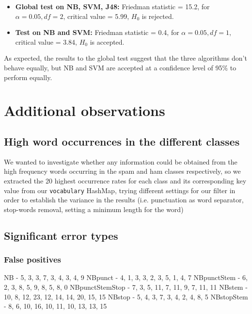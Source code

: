\documentclass[12pt,a4paper]{report}
\begin{document}
\begin{itemize}
\item \textbf{Global test on NB, SVM, J48:} Friedman statistic = 15.2, for $ \alpha = 0.05, df = 2 $, critical value = 5.99, $ H_0 $ is rejected.
\item \textbf{Test on NB and SVM:} Friedman statistic = 0.4, for $ \alpha = 0.05, df = 1 $, critical value = 3.84, $ H_0 $ is accepted.
\end{itemize}

As expected, the results to the global test suggest that the three algorithms don't behave equally, but NB and SVM are accepted at a confidence level of 95\% to perform equally.

\section{Additional observations}
\subsection{High word occurrences in the different classes}
We wanted to investigate whether any information could be obtained from the high frequency words occurring in the spam and ham classes respectively, so we extracted the 20 highest occurrence rates for each class and its corresponding key value from our \texttt{vocabulary} HashMap, trying different settings for our filter in order to establish the variance in the results (i.e. punctuation as word separator, stop-words removal, setting a minimum length for the word)

\subsection{Significant error types}
\subsubsection{False positives}
NB - 5, 3, 3, 7, 3, 4, 3, 4, 9
NBpunct - 4, 1, 3, 3, 2, 3, 5, 1, 4, 7
NBpunctStem - 6, 2, 3, 8, 5, 9, 8, 5, 8, 0
NBpunctStemStop - 7, 3, 5, 11, 7, 11, 9, 7, 11, 11
NBstem - 10, 8, 12, 23, 12, 14, 14, 20, 15, 15
NBstop - 5, 4, 3, 7, 3, 4, 2, 4, 8, 5
NBstopStem - 8, 6, 10, 16, 10, 11, 10, 13, 13, 15
\end{document}
